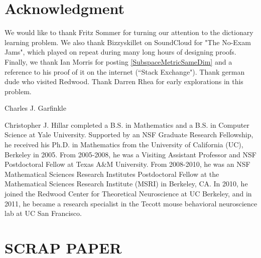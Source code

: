 \documentclass[journal, onecolumn]{IEEEtran}
\begin{document}

\section*{Acknowledgment}
We would like to thank Fritz Sommer for turning our attention to the dictionary learning problem. We also thank Bizzyskillet on SoundCloud for "The No-Exam Jams", which played on repeat during many long hours of designing proofs. Finally, we thank Ian Morris for posting \eqref{SubspaceMetricSameDim} and a reference to his proof of it on the internet (``Stack Exchange").
Thank german dude who visited Redwood.  Thank Darren Rhea for early explorations in this problem.






\begin{IEEEbiographynophoto}{Charles J. Garfinkle}
\end{IEEEbiographynophoto}

\begin{IEEEbiographynophoto}{Christopher J. Hillar}
completed a B.S. in Mathematics and a B.S. in Computer Science at Yale University.  Supported by an NSF Graduate Research Fellowship, he received his Ph.D. in Mathematics from the University of California (UC), Berkeley in 2005. From 2005-2008, he was a Visiting Assistant Professor and NSF Postdoctoral Fellow at Texas A\&M University. From 2008-2010, he was an NSF Mathematical Sciences Research Institutes Postdoctoral Fellow at the Mathematical Sciences Research Institute (MSRI) in Berkeley, CA.  In 2010, he joined the Redwood Center for Theoretical Neuroscience at UC Berkeley, and in 2011, he  became a research specialist in the Tecott mouse behavioral neuroscience lab at UC San Francisco.
\end{IEEEbiographynophoto}


\section*{SCRAP PAPER}
\end{document}
